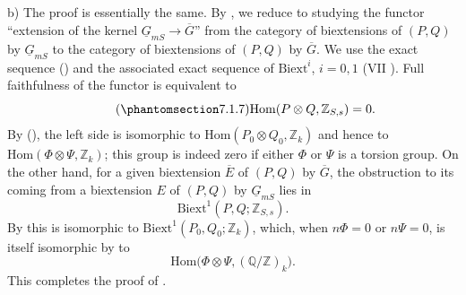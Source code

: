 \smallskip
\noindent b) The proof is essentially the same.  By , we reduce to
studying the functor ``extension of the kernel
$\underline G_{mS}\to\overline G$'' from the category of biextensions of
$(P,Q)$ by $\underline G_{mS}$ to the category of biextensions of $(P,Q)$ by
$\overline G$.  We use the exact sequence () and the associated exact
sequence of $\mathrm{Biext}^i$, $i=0,1$ (VII ).  Full faithfulness of
the functor is equivalent to
\begin{equation}\tag{\SGARefTarget{sga7.sga7i.eviii.n7-1-7}{7.1.7}}
 \mathrm{Hom}(P\otimes Q,\mathbb Z_{S,s})=0.
\end{equation}
By (), the left side is isomorphic to
$\mathrm{Hom}(P_0\otimes Q_0,\mathbb Z_k)$ and hence to
$\mathrm{Hom}(\Phi\otimes\Psi,\mathbb Z_k)$; this group is indeed zero if
either $\Phi$ or $\Psi$ is a torsion group.  On the other hand, for a given
biextension $\overline E$ of $(P,Q)$ by $\overline G$, the obstruction to
its coming from a biextension $E$ of $(P,Q)$ by $\underline G_{mS}$ lies in
\[
 \mathrm{Biext}^1(P,Q;\mathbb Z_{S,s}).
\]
By  this is isomorphic to
$\mathrm{Biext}^1(P_0,Q_0;\mathbb Z_k)$, which, when $n\Phi=0$ or
$n\Psi=0$, is itself isomorphic by  to
\[
 \mathrm{Hom}\bigl(\Phi\otimes\Psi,(\mathbb Q/\mathbb Z)_k\bigr).
\]
This completes the proof of .

